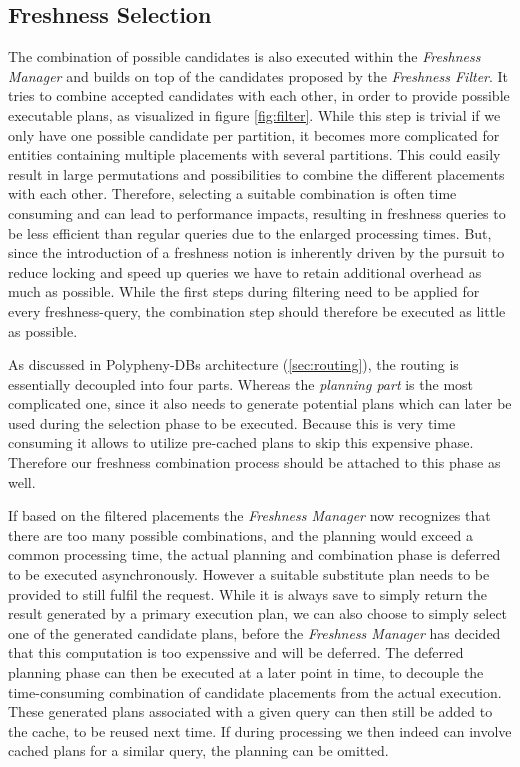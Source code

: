 

\subsection{Freshness Selection}
\label{sec:fresh_select}

The combination of possible candidates is also executed within the \emph{Freshness Manager} and builds on top of the candidates proposed by the \emph{Freshness Filter}.
It tries to combine accepted candidates with each other, in order to provide possible executable plans, as visualized in figure \ref{fig:filter}.
While this step is trivial if we only have one possible candidate per partition, it becomes more complicated for entities containing multiple placements 
with several partitions. This could easily result in large permutations and possibilities to combine the different placements with each other.
Therefore, selecting a suitable combination is often time consuming and can lead to performance impacts, 
resulting in freshness queries to be less efficient than regular queries due to the enlarged processing times. 
But, since the introduction of a freshness notion is inherently driven by the pursuit to reduce locking and speed up queries we have to 
retain additional overhead as much as possible. 
While the first steps during filtering need to be applied for every freshness-query, the combination step should therefore be executed as little as possible.

As discussed in Polypheny-DBs architecture (\ref{sec:routing}), the routing is essentially decoupled into four parts.
Whereas the \emph{planning part} is the most complicated one, since it also needs to generate potential plans which can later be used during the selection phase 
to be executed. Because this is very time consuming it allows to utilize pre-cached plans to skip this expensive phase.
Therefore our freshness combination process should be attached to this phase as well.

If based on the filtered placements the \emph{Freshness Manager} now recognizes that there are too many possible combinations, and the planning would 
exceed a common processing time, the actual planning and combination phase is deferred to be executed asynchronously.
However a suitable substitute plan needs to be provided to still fulfil the request.
While it is always save to simply return the result generated by a primary execution plan, we can also choose to simply select one of the generated candidate plans, before
the \emph{Freshness Manager} has decided that this computation is too expenssive and will be deferred. 
The deferred planning phase can then be executed at a later point in time, to decouple the time-consuming combination of candidate placements from the actual execution.
These generated plans associated with a given query can then still be added to the cache, to be reused next time.
If during processing we then indeed can involve cached plans for a similar query, the planning can be omitted.

